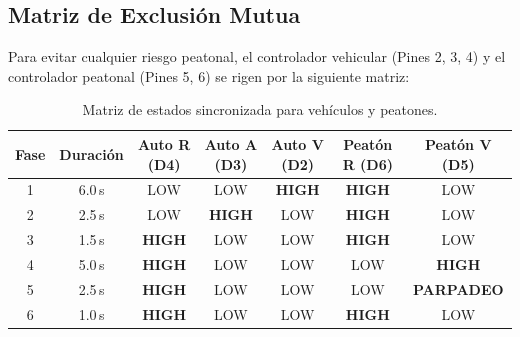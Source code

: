 \documentclass[12pt,a4paper]{article}
\begin{document}
\subsection{Matriz de Exclusión Mutua}
Para evitar cualquier riesgo peatonal, el controlador vehicular (Pines 2, 3, 4) y el controlador peatonal (Pines 5, 6) se rigen por la siguiente matriz:

\begin{table}[H]
\centering
\caption{Matriz de estados sincronizada para vehículos y peatones.}
\begin{tabular}{ccccccc}
\toprule
\textbf{Fase} & \textbf{Duración} & \textbf{Auto R (D4)} & \textbf{Auto A (D3)} & \textbf{Auto V (D2)} & \textbf{Peatón R (D6)} & \textbf{Peatón V (D5)} \\
\midrule
1 & 6.0\,s & LOW & LOW & \textbf{HIGH} & \textbf{HIGH} & LOW \\
2 & 2.5\,s & LOW & \textbf{HIGH} & LOW & \textbf{HIGH} & LOW \\
3 & 1.5\,s & \textbf{HIGH} & LOW & LOW & \textbf{HIGH} & LOW \\
4 & 5.0\,s & \textbf{HIGH} & LOW & LOW & LOW & \textbf{HIGH} \\
5 & 2.5\,s & \textbf{HIGH} & LOW & LOW & LOW & \textbf{PARPADEO} \\
6 & 1.0\,s & \textbf{HIGH} & LOW & LOW & \textbf{HIGH} & LOW \\
\bottomrule
\end{tabular}
\end{table}
\end{document}
